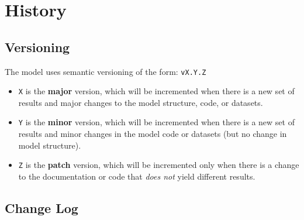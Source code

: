 \documentclass[
]{book}
\providecommand{\tightlist}{%
  \setlength{\itemsep}{0pt}\setlength{\parskip}{0pt}}
\begin{document}
\hypertarget{history}{%
\chapter{History}\label{history}}

\hypertarget{versioning}{%
\section{Versioning}\label{versioning}}

The model uses semantic versioning of the form: \texttt{vX.Y.Z}

\begin{itemize}
\tightlist
\item
  \texttt{X} is the \textbf{major} version, which will be incremented when there is a new set of results and major changes to the model structure, code, or datasets.
\item
  \texttt{Y} is the \textbf{minor} version, which will be incremented when there is a new set of results and minor changes in the model code or datasets (but no change in model structure).
\item
  \texttt{Z} is the \textbf{patch} version, which will be incremented only when there is a change to the documentation or code that \emph{does not} yield different results.
\end{itemize}

\hypertarget{change-log}{%
\section{Change Log}\label{change-log}}
\end{document}
